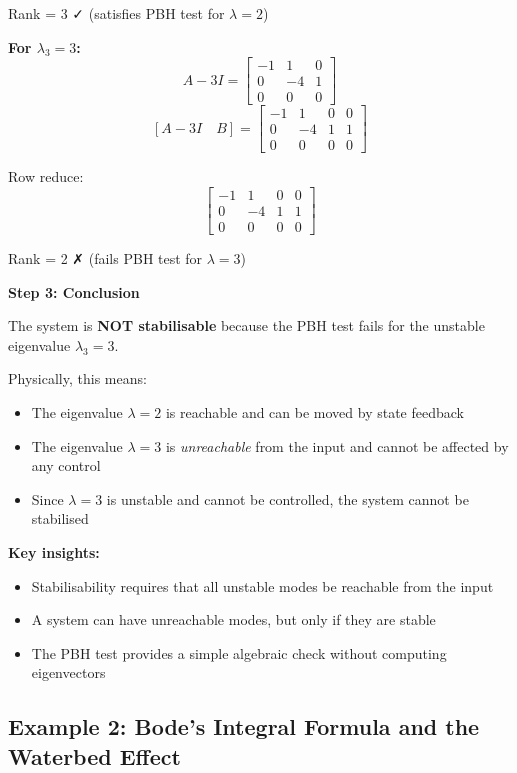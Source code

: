 \documentclass[11pt,a4paper]{article}
\begin{document}
Rank = 3 ✓ (satisfies PBH test for $\lambda = 2$)

\textbf{For $\lambda_3 = 3$:}
\[
A - 3I = \begin{bmatrix} -1 & 1 & 0 \\ 0 & -4 & 1 \\ 0 & 0 & 0 \end{bmatrix}
\]
\[
[A - 3I \quad B] = \begin{bmatrix} -1 & 1 & 0 & 0 \\ 0 & -4 & 1 & 1 \\ 0 & 0 & 0 & 0 \end{bmatrix}
\]

Row reduce:
\[
\begin{bmatrix} -1 & 1 & 0 & 0 \\ 0 & -4 & 1 & 1 \\ 0 & 0 & 0 & 0 \end{bmatrix}
\]

Rank = 2 ✗ (fails PBH test for $\lambda = 3$)

\textbf{Step 3: Conclusion}

The system is \textbf{NOT stabilisable} because the PBH test fails for the unstable eigenvalue $\lambda_3 = 3$.

Physically, this means:
\begin{itemize}
\item The eigenvalue $\lambda = 2$ is reachable and can be moved by state feedback
\item The eigenvalue $\lambda = 3$ is \emph{unreachable} from the input and cannot be affected by any control
\item Since $\lambda = 3$ is unstable and cannot be controlled, the system cannot be stabilised
\end{itemize}

\textbf{Key insights:}
\begin{itemize}
\item Stabilisability requires that all unstable modes be reachable from the input
\item A system can have unreachable modes, but only if they are stable
\item The PBH test provides a simple algebraic check without computing eigenvectors
\end{itemize}

\subsection{Example 2: Bode's Integral Formula and the Waterbed Effect}
\end{document}
